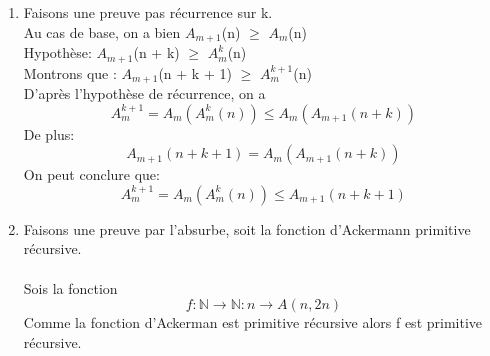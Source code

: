 \documentclass[]{article}
\begin{document}
\begin{enumerate}
\begin{enumerate}
\item Faisons une preuve pas récurrence sur k.\\
Au cas de base, on a bien $A_{m+1}$\normalsize (n) $\ge$ $A_m$\normalsize (n)\\
Hypothèse: $A_{m+1}$\normalsize (n + k) $\ge$ $A^k_m$\normalsize (n)\\
Montrons que : $A_{m+1}$(n + k + 1) $\ge$ $A^{k+1}_m$(n)\\
D'après l'hypothèse de récurrence, on a \\
\[A^{k+1}_m = A_m(A^k_m(n)) \le A_m(A_{m+1}(n + k))\] 
De plus:\\
\[A_{m+1}(n + k + 1) = A_m(A_{m+1}(n + k))\]
On peut conclure que:\\
\[A^{k+1}_m = A_m(A^k_m(n)) \le A_{m+1}(n + k + 1)\]
\item 
Faisons une preuve par l'absurbe, soit la fonction d'Ackermann primitive récursive.\\\\
Sois la fonction \[f: \mathbb{N} \rightarrow \mathbb{N} : n \rightarrow A(n,2n)\]
Comme la fonction d'Ackerman est primitive récursive alors f est primitive récursive.   

\end{enumerate}

\end{enumerate}
\end{document}
